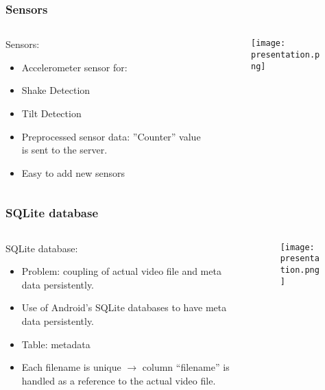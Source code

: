 \begin{frame}	
	\frametitle{Sensors}
	\begin{columns}[t]
		\begin{column}[t]{0.5\linewidth}
			Sensors:
			\begin{itemize}
				\item Accelerometer sensor for:
				\item Shake Detection
				\item Tilt Detection
				\item Preprocessed sensor data: ”Counter” value is sent to the server.
				\item Easy to add new sensors
			\end{itemize}
		\end{column}
		\begin{column}[t]{0.5\linewidth}
			\begin{figure}[!t]
				\centering
				\texttt{[image: presentation.png]}
				\label{fig:sensors}
			\end{figure}
		\end{column}				
	\end{columns}	
\end{frame}

\begin{frame}	
	\frametitle{SQLite database}
	\begin{columns}[t]
		\begin{column}[t]{0.5\linewidth}
			SQLite database:
				\begin{itemize}
					\item Problem: coupling of actual video file and meta data persistently. 
					\item Use of Android's SQLite databases to have meta data persistently.
					\item Table: metadata
					\item Each filename is unique $\rightarrow$ column ``filename'' is handled as a reference to the actual video file.
				\end{itemize}
		\end{column}
		\begin{column}[t]{0.5\linewidth}
			\begin{figure}[!t]
				\centering


				\texttt{[image: presentation.png]}
				\label{fig:sql}
			\end{figure}
		\end{column}
	\end{columns}		
\end{frame}

